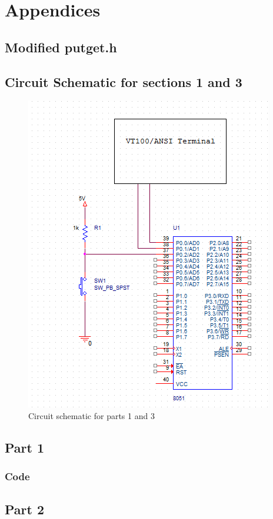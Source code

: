 \documentclass[12pt]{article}
\begin{document}
\pagebreak
\section{Appendices}
\subsection{Modified putget.h}
	
\subsection{Circuit Schematic for sections 1 and 3}
	\begin{figure}[H]
		\centering
		\includegraphics{schematic.png}
		\caption{Circuit schematic for parts 1 and 3}
		\label{schematic}
	\end{figure} 
\subsection{Part 1}
	\subsubsection{Code}
		
\subsection{Part 2}
\end{document}
